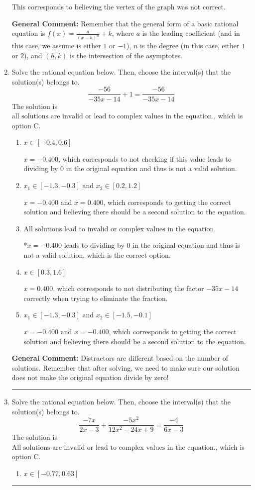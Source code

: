 \documentclass{extbook}[14pt]
\newcommand{\litem}[1]{\item #1

\rule{\textwidth}{0.4pt}}
\begin{document}
\begin{enumerate}
{\begin{enumerate}[label=\Alph*.]
This corresponds to believing the vertex of the graph was not correct.
\end{enumerate}

\textbf{General Comment:} Remember that the general form of a basic rational equation is $ f(x) = \frac{a}{(x-h)^n} + k$, where $a$ is the leading coefficient (and in this case, we assume is either $1$ or $-1$), $n$ is the degree (in this case, either $1$ or $2$), and $(h, k)$ is the intersection of the asymptotes.
}
\litem{
Solve the rational equation below. Then, choose the interval(s) that the solution(s) belongs to.
\[ \frac{-56}{-35x -14} + 1 = \frac{-56}{-35x -14} \]The solution is \( \text{all solutions are invalid or lead to complex values in the equation.} \), which is option C.\begin{enumerate}[label=\Alph*.]
\item \( x \in [-0.4,0.6] \)

$x = -0.400$, which corresponds to not checking if this value leads to dividing by 0 in the original equation and thus is not a valid solution.
\item \( x_1 \in [-1.3, -0.3] \text{ and } x_2 \in [0.2,1.2] \)

$x = -0.400 \text{ and } x = 0.400$, which corresponds to getting the correct solution and believing there should be a second solution to the equation.
\item \( \text{All solutions lead to invalid or complex values in the equation.} \)

*$x = -0.400$ leads to dividing by 0 in the original equation and thus is not a valid solution, which is the correct option.
\item \( x \in [0.3,1.6] \)

$x = 0.400$, which corresponds to not distributing the factor $-35x -14$ correctly when trying to eliminate the fraction.
\item \( x_1 \in [-1.3, -0.3] \text{ and } x_2 \in [-1.5,-0.1] \)

$x = -0.400 \text{ and } x = -0.400$, which corresponds to getting the correct solution and believing there should be a second solution to the equation.
\end{enumerate}

\textbf{General Comment:} Distractors are different based on the number of solutions. Remember that after solving, we need to make sure our solution does not make the original equation divide by zero!
}
\litem{
Solve the rational equation below. Then, choose the interval(s) that the solution(s) belongs to.
\[ \frac{-7x}{2x -3} + \frac{-5x^{2}}{12x^{2} -24 x + 9} = \frac{-4}{6x -3} \]The solution is \( \text{All solutions are invalid or lead to complex values in the equation.} \), which is option C.\begin{enumerate}[label=\Alph*.]
\item \( x \in [-0.77,0.63] \)


\end{enumerate}}
\end{enumerate}
\end{document}
